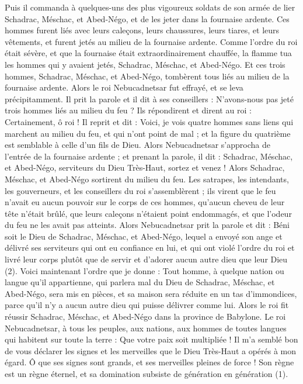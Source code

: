 \begin{multicols}{2}
Puis il commanda à quelques-uns des plus vigoureux soldats de son armée de lier Schadrac, Méschac, et Abed-Négo, et de les jeter dans la fournaise ardente.
Ces hommes furent liés avec leurs caleçons, leurs chaussures, leurs tiares, et leurs vêtements, et furent jetés au milieu de la fournaise ardente.
Comme l’ordre du roi était sévère, et que la fournaise était extraordinairement chauffée, la flamme tua les hommes qui y avaient jetés, Schadrac, Méschac, et Abed-Négo.
Et ces trois hommes, Schadrac, Méschac, et Abed-Négo, tombèrent tous liés au milieu de la fournaise ardente.
Alors le roi Nebucadnetsar fut effrayé, et se leva précipitamment. Il prit la parole et il dit à ses conseillers : N'avons-nous pas jeté trois hommes liés  au milieu du feu ? Ils répondirent et dirent au roi : Certainement, ô roi !
Il reprit et dit : Voici, je vois quatre hommes sans liens qui marchent au milieu du feu, et qui n’ont point de mal ; et la figure du quatrième est semblable à celle d’un fils de Dieu.
Alors Nebucadnetsar s'approcha de l’entrée de la fournaise ardente ; et prenant la parole, il dit : Schadrac, Méschac, et Abed-Négo, serviteurs du Dieu Très-Haut, sortez et venez ! Alors Schadrac, Méschac, et Abed-Négo sortirent du milieu du feu.
Les satrapes, les intendants, les gouverneurs, et les conseillers du roi s'assemblèrent ; ils virent que le feu n'avait eu aucun pouvoir sur le corps de ces hommes, qu’aucun cheveu de leur tête n’était brûlé, que leurs caleçons n’étaient point endommagés, et que l’odeur du feu ne les avait pas atteints.
Alors Nebucadnetsar prit la parole et dit : Béni soit le Dieu de Schadrac, Méschac, et Abed-Négo, lequel a envoyé son ange et délivré ses serviteurs qui ont eu confiance en lui, et qui ont violé l’ordre du roi et livré leur corps plutôt que de servir et d’adorer aucun autre dieu  que leur Dieu (2).
Voici maintenant l’ordre que je donne : Tout homme, à quelque nation ou langue qu'il appartienne, qui parlera mal du Dieu de Schadrac, Méschac, et Abed-Négo, sera mis en pièces, et sa maison sera réduite en un tas d’immondices, parce qu'il n'y a aucun autre dieu qui puisse délivrer comme lui.
Alors le roi fit réussir Schadrac, Méschac, et Abed-Négo dans la province de Babylone.
\VerseOne{}Le roi Nebucadnetsar, à tous les peuples, aux nations, aux hommes de toutes  langues qui habitent sur toute la terre : Que votre paix soit multipliée !
Il m'a semblé bon de vous déclarer les signes et les merveilles que le Dieu Très-Haut a opérés à mon égard.
Ô que ses signes sont grands, et ses merveilles pleines de force ! Son règne est un règne éternel, et sa domination subsiste de génération en génération (1).

\end{multicols}
